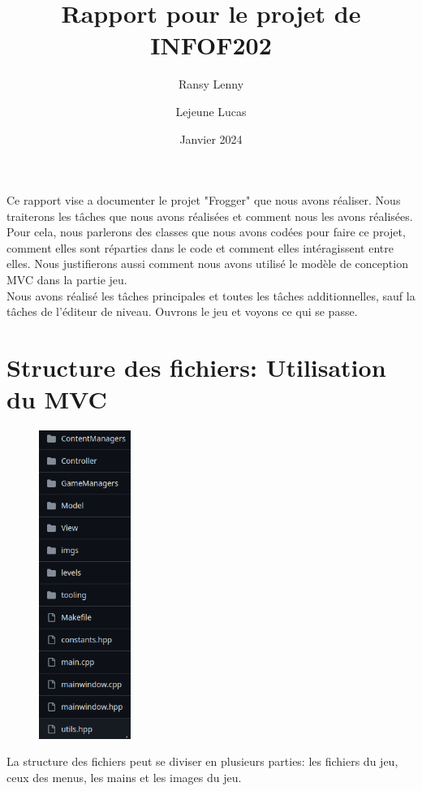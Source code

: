 \documentclass[a4paper, 12pt]{article}
\title{\textbf{Rapport pour le projet de INFOF202}}
\author{
    Ransy Lenny
    \and
    Lejeune Lucas
    }
\date{Janvier 2024}
\begin{document}
\setlength{\parindent}{0em}

\maketitle

Ce rapport vise a documenter le projet "Frogger" que nous avons réaliser. Nous traiterons les tâches que nous avons réalisées et comment nous les avons réalisées. Pour cela, nous parlerons des classes que nous avons codées pour faire ce projet, comment elles sont réparties dans le code et comment elles intéragissent entre elles. Nous justifierons aussi comment nous avons utilisé le modèle de conception MVC dans la partie jeu. \\

Nous avons réalisé les tâches principales et toutes les tâches additionnelles, sauf la tâches de l'éditeur de niveau. 
Ouvrons le jeu et voyons ce qui se passe. 

\section{Structure des fichiers: Utilisation du MVC}
\begin{figure}
    \includegraphics[width=3cm]{Images/folders.png}
\end{figure}

La structure des fichiers peut se diviser en plusieurs parties: les fichiers du jeu, ceux des menus, les mains et les images du jeu. \\
\end{document}
